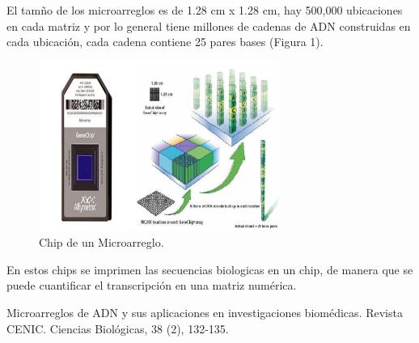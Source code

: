 \documentclass[12pt,letterpaper]{article}
\begin{document}
El tamño de los microarreglos es de 1.28 cm x 1.28 cm, hay 500,000 ubicaciones en cada matriz y por lo general tiene millones de cadenas de ADN construidas en cada ubicación, cada cadena contiene 25 pares bases (Figura 1).
\begin{figure}[H]
\begin{center}
\includegraphics[width=0.7\textwidth]{Genechip.png}
\end{center}
\caption{Chip de un Microarreglo.}
\end{figure}
En estos chips se imprimen las secuencias biologicas en un chip, de manera que se puede cuantificar el transcripción en una matriz numérica.	


\begin{thebibliography}{XXX0000}
   Microarreglos de ADN y sus aplicaciones en investigaciones biomédicas. Revista CENIC. Ciencias Biológicas, 38 (2), 132-135. 
\end{thebibliography} 	
\end{document}
